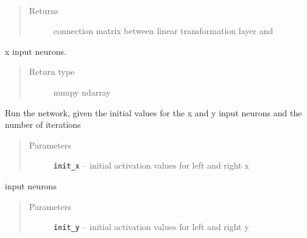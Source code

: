 \documentclass[letterpaper,10pt,english]{sphinxmanual}
\begin{document}
\begin{fulllineitems}
\begin{fulllineitems}
\begin{quote}
\begin{description}
\end{description}\end{quote}

\end{fulllineitems}


\begin{fulllineitems}
\label{neuraltm_docs:neuraltm.NeuralTM.cn_LTL_MCLy}~\begin{quote}\begin{description}
\item[{Returns}] \leavevmode
connection matrix between linear transformation layer and

\end{description}\end{quote}

x input neurons.
\begin{quote}\begin{description}
\item[{Return type}] \leavevmode
numpy ndarray

\end{description}\end{quote}

\end{fulllineitems}


\begin{fulllineitems}
\label{neuraltm_docs:neuraltm.NeuralTM.run_net}
Run the network, given the initial values for the x and y input
neurons and the number of iterations
\begin{quote}\begin{description}
\item[{Parameters}] \leavevmode
\textbf{\texttt{init\_x}} -- initial activation values for left and right x

\end{description}\end{quote}

input neurons
\begin{quote}\begin{description}
\item[{Parameters}] \leavevmode
\textbf{\texttt{init\_y}} -- initial activation values for left and right y


\end{description}
\end{quote}
\end{fulllineitems}
\end{fulllineitems}
\end{document}
